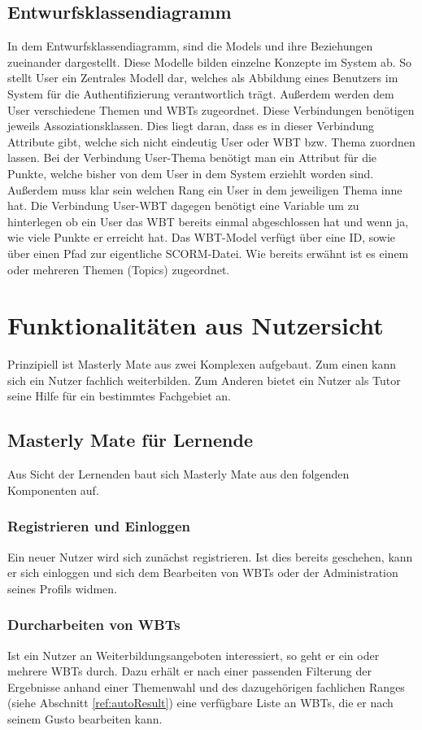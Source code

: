 \subsection{Entwurfsklassendiagramm}
In dem Entwurfsklassendiagramm, sind die Models und ihre Beziehungen zueinander
dargestellt. Diese Modelle bilden einzelne Konzepte im System ab. So stellt User
ein Zentrales Modell dar, welches als Abbildung eines Benutzers im System für
die Authentifizierung verantwortlich trägt. Außerdem werden dem User
verschiedene Themen und WBTs zugeordnet. Diese Verbindungen benötigen jeweils
Assoziationsklassen. Dies liegt daran, dass es in dieser Verbindung Attribute
gibt, welche sich nicht eindeutig User oder WBT bzw. Thema zuordnen lassen. Bei
der Verbindung User-Thema benötigt man ein Attribut für die Punkte, welche
bisher von dem User in dem System erziehlt worden sind. Außerdem muss klar sein
welchen Rang ein User in dem jeweiligen Thema inne hat. Die Verbindung User-WBT
dagegen benötigt eine Variable um zu hinterlegen ob ein User das WBT bereits
einmal abgeschlossen hat und wenn ja, wie viele Punkte er erreicht hat. Das
WBT-Model verfügt über eine ID, sowie über einen Pfad zur eigentliche
SCORM-Datei. Wie bereits erwähnt ist es einem oder mehreren Themen (Topics)
zugeordnet.\label{ref:objectWBT}

\section{Funktionalitäten aus Nutzersicht}
Prinzipiell ist Masterly Mate aus zwei Komplexen aufgebaut. Zum einen kann sich
ein Nutzer fachlich weiterbilden. Zum Anderen bietet ein Nutzer als Tutor seine
Hilfe für ein bestimmtes Fachgebiet an.

\subsection{Masterly Mate für Lernende}
Aus Sicht der Lernenden baut sich Masterly Mate aus den folgenden Komponenten
auf.
\subsubsection{Registrieren und Einloggen}
Ein neuer Nutzer wird sich zunächst registrieren. Ist dies bereits geschehen,
kann er sich einloggen und sich dem Bearbeiten von WBTs oder der Administration
seines Profils widmen.

\subsubsection{Durcharbeiten von WBTs}
Ist ein Nutzer an Weiterbildungsangeboten interessiert, so geht er ein oder
mehrere WBTs durch. Dazu erhält er nach einer passenden Filterung der Ergebnisse
anhand einer Themenwahl und des dazugehörigen fachlichen Ranges (siehe Abschnitt
\ref{ref:autoResult}) eine verfügbare Liste an WBTs, die er nach seinem Gusto
bearbeiten kann.

